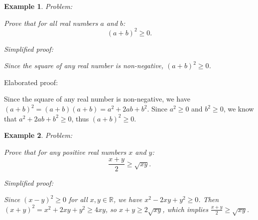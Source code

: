 \documentclass{article}
\newtheorem{example}{Example}
\begin{document}



\begin{example}
Problem:
\begin{tcolorbox}[colback=yellow!10, width=\linewidth]
Prove that for all real numbers $a$ and $b$:
    $$(a+b)^2 \geq 0.$$
\end{tcolorbox}

Simplified proof:
\begin{tcolorbox}[colback=blue!10, width=\linewidth]
Since the square of any real number is non-negative, $(a+b)^2 \ge 0$.
\end{tcolorbox}
\end{example}

Elaborated proof:
\begin{tcolorbox}[colback=green!10, width=\linewidth]
Since the square of any real number is non-negative, we have $(a+b)^2 = (a+b)(a+b) = a^2 + 2ab + b^2$. Since $a^2 \ge 0$ and $b^2 \ge 0$, we know that $a^2 + 2ab + b^2 \ge 0$, thus $(a+b)^2 \ge 0$.
\end{tcolorbox}



\begin{example}
Problem:
\begin{tcolorbox}[colback=yellow!10, width=\linewidth]
Prove that for any positive real numbers $x$ and $y$:
    $$\frac{x+y}{2} \geq \sqrt{xy}.$$
\end{tcolorbox}

Simplified proof:
\begin{tcolorbox}[colback=blue!10, width=\linewidth]
Since $(x-y)^2 \ge 0$ for all $x, y \in \mathbb{R}$, we have $x^2 - 2xy + y^2 \ge 0$. Then $(x+y)^2 = x^2 + 2xy + y^2 \ge 4xy$, so $x+y \ge 2\sqrt{xy}$, which implies $\frac{x+y}{2} \ge \sqrt{xy}$.
\end{tcolorbox}
\end{example}
\end{document}
